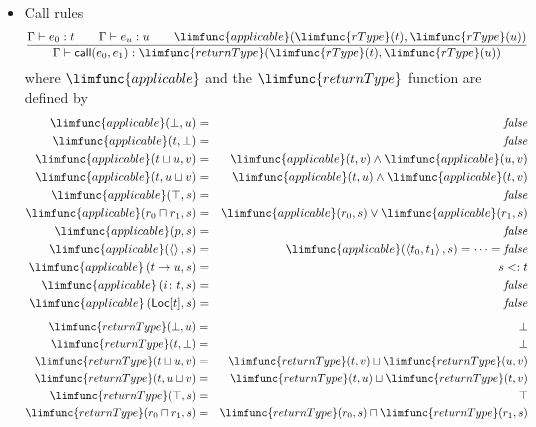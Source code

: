 \documentclass[12pt]{article}
\begin{document}
\begin{itemize}
\item Call rules%
\begin{equation*}
\frac{\Gamma \vdash e_{0}:t\qquad \Gamma \vdash e_{u}:u\qquad \limfunc{%
applicable}(\limfunc{rType}(t),\limfunc{rType}(u))}{\Gamma \vdash \mathsf{%
call}(e_{0},e_{1}):\limfunc{returnType}(\limfunc{rType}(t),\limfunc{rType}%
(u))}
\end{equation*}%
where $\limfunc{applicable}$ and the $\limfunc{returnType}$ function are
defined by%
\begin{eqnarray*}
\limfunc{applicable}(\bot ,u) &=&\mathit{false} \\
\limfunc{applicable}(t,\bot ) &=&\mathit{false} \\
\limfunc{applicable}(t\sqcup u,v) &=&\limfunc{applicable}(t,v)\wedge 
\limfunc{applicable}(u,v) \\
\limfunc{applicable}(t,u\sqcup v) &=&\limfunc{applicable}(t,u)\wedge 
\limfunc{applicable}(t,v) \\
\limfunc{applicable}(\top ,s) &=&\mathit{false} \\
\limfunc{applicable}(r_{0}\sqcap r_{1},s) &=&\limfunc{applicable}%
(r_{0},s)\vee \limfunc{applicable}(r_{1},s) \\
\limfunc{applicable}(p,s) &=&\mathit{false} \\
\limfunc{applicable}(\left\langle {}\right\rangle ,s) &=&\limfunc{applicable}%
(\left\langle t_{0},t_{1}\right\rangle ,s)=\cdots =\mathit{false} \\
\limfunc{applicable}\left( t\rightarrow u,s\right)  &=&s<:t \\
\limfunc{applicable}\left( i\colon t,s\right)  &=&\mathit{false} \\
\limfunc{applicable}\left( \mathsf{Loc}[t],s\right)  &=&\mathit{false}
\end{eqnarray*}%
\begin{eqnarray*}
\limfunc{returnType}(\bot ,u) &=&\bot  \\
\limfunc{returnType}(t,\bot ) &=&\bot  \\
\limfunc{returnType}(t\sqcup u,v) &=&\limfunc{returnType}(t,v)\sqcup 
\limfunc{returnType}(u,v) \\
\limfunc{returnType}(t,u\sqcup v) &=&\limfunc{returnType}(t,u)\sqcup 
\limfunc{returnType}(t,v) \\
\limfunc{returnType}(\top ,s) &=&\top  \\
\limfunc{returnType}(r_{0}\sqcap r_{1},s) &=&\limfunc{returnType}%
(r_{0},s)\sqcap \limfunc{returnType}(r_{1},s) \\

\end{eqnarray*}
\end{itemize}
\end{document}

